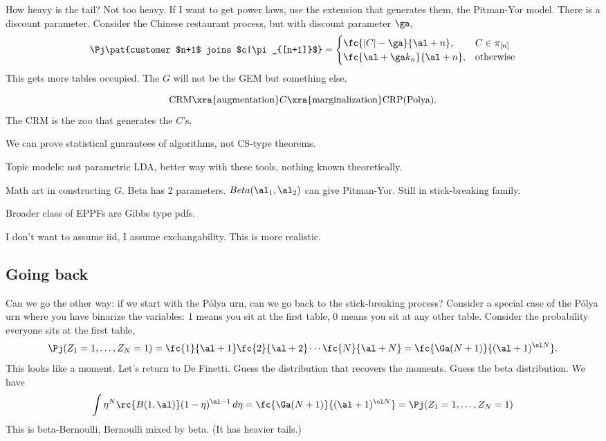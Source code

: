 How heavy is the tail? Not too heavy. If I want to get power laws, use the extension that generates them, the Pitman-Yor model. There is a discount parameter. Consider the Chinese restaurant process, but with discount parameter $\ga$,
$$
\Pj\pat{customer $n+1$ joins $c|\pi_{[n+1]}$}
 = \begin{cases}
\fc{|C|-\ga}{\al+n},&C\in \pi_{[n]}\\
\fc{\al + \ga k_n}{\al+n}, &\text{otherwise}
\end{cases}
$$
This gets more tables occupied. The $G$ will not be the GEM but something else.

$$\text{CRM}\xra{\text{augmentation}}C\xra{\text{marginalization}}\text{CRP(Polya)}.$$ The CRM is the zoo that generates the $C$'s.

We can prove statistical guarantees of algorithms, not CS-type theorems.

Topic models: not parametric LDA, better way with these tools, nothing known theoretically.

Math art in constructing $G$. Beta has 2 parameters. $Beta(\al_1,\al_2)$ can give Pitman-Yor. Still in stick-breaking family.

Broader class of EPPFs are Gibbs type pdfs.

I don't want to assume iid, I assume exchangability. This is more realistic.


\subsection{Going back}
Can we go the other way: if we start with the P\'olya urn, can we go back to the stick-breaking process? Consider a special case of the P\'olya urn where you have binarize the variables: 1 means you sit at the first table, 0 means you sit at any other table.
Consider the probability everyone sits at the first table, 
$$
\Pj(Z_1=1,\ldots, Z_N=1) = \fc{1}{\al+1} \fc{2}{\al+2} \cdots \fc{N}{\al + N} = \fc{\Ga(N+1)}{(\al+1)^{\ol N}}.
$$
This looks like a moment. Let's return to De Finetti. Guess the distribution that recovers the moments. Guess the beta distribution. 
We have
$$
\int \eta^N \rc{B(1,\al)} (1-\eta)^{\al - 1}\,d\eta = 
 \fc{\Ga(N+1)}{(\al+1)^{\ol N}}
 =\Pj(Z_1=1,\ldots, Z_N=1) 
$$
This is beta-Bernoulli, Bernoulli mixed by beta. %
(It has heavier tails.)

